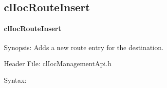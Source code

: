 \begin{flushleft}
\newpage




\subsection{clIocRouteInsert}
\hypertarget{pageioc203}{}\paragraph{cl\-Ioc\-Route\-Insert}\label{pageioc203}
\begin{Desc}
\item[Synopsis:]Adds a new route entry for the destination.\end{Desc}
\begin{Desc}
\item[Header File:]clIocManagementApi.h\end{Desc}
\begin{Desc}
\item[Syntax:]


\end{Desc}
\end{flushleft}
